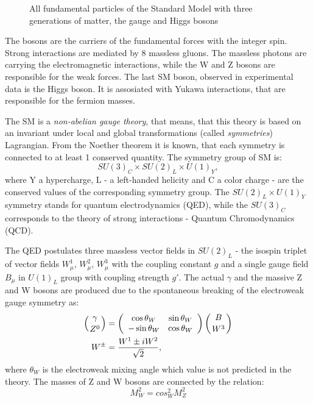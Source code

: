 \begin{figure}[!tbp]
\caption{All fundamental particles of the Standard Model with three generations of matter, the gauge and Higgs bosons \cite{SMParticles}}
\label{fig:SMPart}
\end{figure}

The bosons are the carriers of the fundamental forces with the integer spin. Strong interactions are mediated by 8 massless gluons. The massless photons are carrying the electromagnetic interactions, while the W and Z bosons are responsible for the weak forces. The last SM boson, observed in experimental data is the Higgs boson\cite{HiggsDiscoATLAS, HiggsDiscoCMS}. It is assosiated with Yukawa interactions, that are responsible for the fermion masses. 

The SM is a \textit{non-abelian gauge theory}, that means, that this theory is based on an invariant under local and global transformations (called \textit{symmetries}) Lagrangian. From the Noether theorem\cite{Noether1, Noether2} it is known, that each symmetry is connected to at least 1 conserved quantity. The symmetry group of SM is:
\begin{equation}
SU(3)_C \times SU(2)_L \times U(1)_Y,
\end{equation}
where Y a hypercharge, L - a left-handed helicity and C a color charge - are the conserved values of the corresponding symmetry group. The  $SU(2)_L \times U(1)_Y$ symmetry stands for quantum electrodynamics (QED), while the $SU(3)_C$ corresponds to the theory of strong interactions - Quantum Chromodynamics (QCD)\cite{QCD1, QCD2, QCD3}. 

The QED postulates three massless vector fields in $SU(2)_L$ - the isospin triplet of vector fields $W^1_\mu$, $W^2_\mu$, $W^3_\mu$ with the coupling constant $g$ and a single gauge field $B_\mu$ in $U(1)_L$ group with coupling strength $g'$. The actual $\gamma$ and the massive Z and W bosons are produced due to the spontaneous breaking of the electroweak gauge symmetry as:
        \begin{align}
                \left(\gamma \atop Z^0 \right)
                &= \left(
            \begin{array}{cc}
            \cos \theta_W & \sin \theta_W \\
            -\sin \theta_W & \cos \theta_W
            \end{array}
            \right)
                \left(B \atop W^3 \right)
                 \\
                 W^\pm& = \frac{W^1 \pm i W^2}{\sqrt{2}},
        \end{align}
where  $\theta_W$ is the electroweak mixing angle which value is not predicted in the theory. The masses of Z and W bosons are connected by the relation:
\begin{equation}
M^2_W=cos^2_W M^2_Z
\end{equation}


